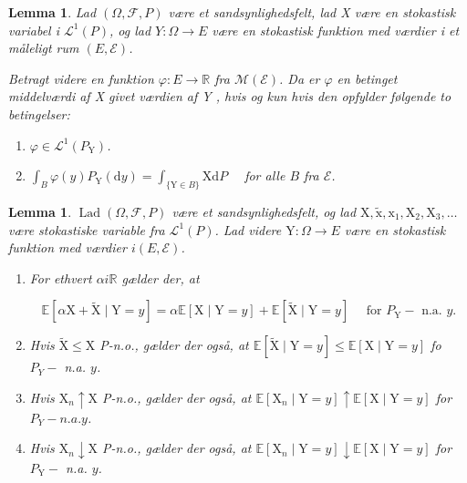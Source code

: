 \documentclass{article}
\newcommand{\1}{\mathbbm{1}}
\theoremstyle{boxed}
\newtheorem{lemma}[theorem]{Lemma}
\begin{document}
\begin{theorem-box}
    \begin{lemma}
        Lad $(\Omega, \mathcal{F}, P)$ være et sandsynlighedsfelt, lad X være en stokastisk variabel i $\mathcal{L}^1(P)$, og lad $Y: \Omega \rightarrow E$ være en stokastisk funktion med værdier i et måleligt rum $(E, \mathcal{E})$.

Betragt videre en funktion $\varphi: E \rightarrow \mathbb{R}$ fra $\mathcal{M}(\mathcal{E})$.
Da er $\varphi$ en betinget middelværdi af X givet værdien af Y , hvis og kun hvis den opfylder følgende to betingelser:
\begin{enumerate}
    \item[\textnormal{(i)}] $\varphi \in \mathcal{L}^1\left(P_{\mathrm{Y}}\right)$.
    \item[\textnormal{(ii)}] $\int_B \varphi(y) P_{\mathrm{Y}}(\mathrm{d} y)=\int_{\{\mathrm{Y} \in B\}} \mathrm{X} \mathrm{d} P \quad$ for alle $B$ fra $\mathcal{E}$. 
\end{enumerate}
    \end{lemma}
\end{theorem-box}
\begin{theorem-box}
    \begin{lemma}
        $\operatorname{Lad}(\Omega, \mathcal{F}, P)$ være et sandsynlighedsfelt, og lad $\mathrm{X}, \tilde{\mathrm{x}}, \mathrm{x}_1, \mathrm{X}_2, \mathrm{X}_3, \ldots$ være stokastiske variable fra $\mathcal{L}^1(P)$. Lad videre $\mathrm{Y}: \Omega \rightarrow E$ være en stokastisk funktion med værdier $i(E, \mathcal{E})$.
\begin{enumerate}
    \item[\textnormal{(i)}] For ethvert $\alpha i \mathbb{R}$ gælder der, at

    $$
    \mathbb{E}[\alpha \mathrm{X}+\tilde{\mathrm{X}} \mid \mathrm{Y}=y]=\alpha \mathbb{E}[\mathrm{X} \mid \mathrm{Y}=y]+\mathbb{E}[\tilde{\mathrm{X}} \mid \mathrm{Y}=y] \quad \text { for } P_{\mathrm{Y}}-\text { n.a. } y .
    $$
    \item[\textnormal{(ii)}] Hvis $\tilde{\mathrm{X}} \leq \mathrm{X}$ P-n.o., gælder der også, at $\mathbb{E}[\tilde{\mathrm{X}} \mid \mathrm{Y}=y] \leq \mathbb{E}[\mathrm{X} \mid \mathrm{Y}=y]$ fo $P_Y-$ n.a. $y$.
    \item[\textnormal{(iii)}] Hvis $\mathrm{X}_n \uparrow \mathrm{X}$ P-n.o., gælder der også, at $\mathbb{E}\left[\mathrm{X}_n \mid \mathrm{Y}=y\right] \uparrow \mathbb{E}[\mathrm{X} \mid \mathrm{Y}=y]$ for $P_Y-n . a . y$.
    \item[\textnormal{(iv)}] Hvis $\mathrm{X}_n \downarrow \mathrm{X}$ P-n.o., gælder der også, at $\mathbb{E}\left[\mathrm{X}_n \mid \mathrm{Y}=y\right] \downarrow \mathbb{E}[\mathrm{X} \mid \mathrm{Y}=y]$ for $P_{\mathrm{Y}}-$ n.a. $y$.
\end{enumerate}
\end{lemma}
\end{theorem-box}
\end{document}
